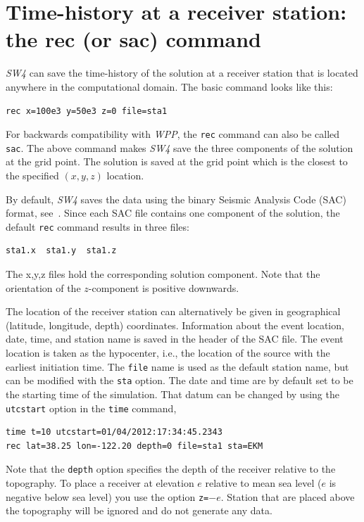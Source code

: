 \documentclass[11pt]{report}
\begin{document}
\section{Time-history at a receiver station: the rec (or sac) command}\label{sec:rec}

\emph{SW4} can save the time-history of the solution at a receiver station that is located anywhere
in the computational domain. The basic command looks like this:
\begin{verbatim}
rec x=100e3 y=50e3 z=0 file=sta1
\end{verbatim}
For backwards compatibility with \emph{WPP}, the \verb+rec+ command can also be called \verb+sac+.
The above command makes \emph{SW4} save the three components of the solution at the grid point. The
solution is saved at the grid point which is the closest to the specified $(x,y,z)$ location. 

By default, \emph{SW4} saves the data using the binary Seismic Analysis Code (SAC) format,
see~\cite{Goldstein-et-al}. Since each SAC file contains one component of the solution, the default
\verb+rec+ command results in three files:
\begin{verbatim}
sta1.x  sta1.y  sta1.z
\end{verbatim}
The x,y,z files hold the corresponding solution component. Note that the orientation of the
$z$-component is positive downwards.

The location of the receiver station can alternatively be given in geographical (latitude,
longitude, depth) coordinates. Information about the event location, date, time, and station name is
saved in the header of the SAC file. The event location is taken as the hypocenter, i.e., the
location of the source with the earliest initiation time. The \verb+file+ name is used as the
default station name, but can be modified with the \verb+sta+ option. The date and time are by
default set to be the starting time of the simulation. That datum can be changed by using the
\verb+utcstart+ option in the \verb+time+ command,
%
\begin{verbatim}
time t=10 utcstart=01/04/2012:17:34:45.2343
rec lat=38.25 lon=-122.20 depth=0 file=sta1 sta=EKM
\end{verbatim}
Note that the \verb+depth+ option specifies the depth of the receiver relative to the topography. To
place a receiver at elevation $e$ relative to mean sea level ($e$ is negative below sea level) you
use the option {\tt z=}$-e$. Station that are placed above the topography will be ignored and do not
generate any data.
\end{document}
